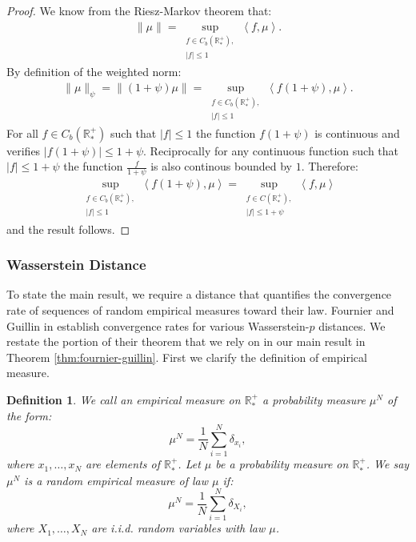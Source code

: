 \documentclass[11pt,a4paper]{article}
\newcommand{\RRP}{\mathbb{R}^+_*}
\newcommand{\brac}[1]{\left\langle#1\right\rangle}
\newtheorem{definition}[theorem]{Definition}
\begin{document}
\begin{proof}
    We know from the Riesz-Markov theorem that:
    \begin{align*}
        \|\mu\| = \sup\limits_{\substack{f \in C_b(\RRP), \\|f| \leq 1}}\brac{f,\mu}.
    \end{align*}
    By definition of the weighted norm:
    \begin{align*}
        \|\mu\|_{\psi} = \|(1 + \psi)\mu\| = \sup\limits_{\substack{f \in C_b(\RRP), \\ |f| \leq 1}}\brac{f(1 + \psi),\mu}.
    \end{align*}
    For all $f \in C_b(\RRP)$ such that $|f| \leq 1$ the function $f(1 + \psi)$ is continuous and verifies $|f(1 + \psi)| \leq 1 + \psi$. Reciprocally for any continuous function such that $|f| \leq 1 + \psi$ the function $\frac{f}{1 + \psi}$ is also continous bounded by $1$. Therefore:
    \begin{align*}
        \sup\limits_{\substack{f \in C_b(\RRP), \\|f| \leq 1}}\brac{f(1 + \psi),\mu} = \sup\limits_{\substack{f \in C(\RRP), \\ |f| \leq 1 + \psi}}\brac{f,\mu}
    \end{align*}
    and the result follows.
\end{proof}


\subsubsection*{Wasserstein Distance}
To state the main result, we require a distance that quantifies the convergence rate of sequences of random empirical measures toward their law. Fournier and Guillin in \cite{fournier2015rate} establish convergence rates for various Wasserstein-$p$ distances. We restate the portion of their theorem that we rely on in our main result in Theorem \ref{thm:fournier-guillin}. First we clarify the definition of empirical measure.
\begin{definition}
We call an \emph{empirical measure} on $\RRP$ a probability measure $\mu^N$ of the form:
\[
\mu^N = \dfrac{1}{N} \sum_{i = 1}^N \delta_{x_i},
\]
where $x_1, \dots, x_N$ are elements of $\RRP$. Let $\mu$ be a probability measure on $\RRP$. We say $\mu^N$ is a random empirical measure of \emph{law $\mu$} if:
\[
\mu^N = \dfrac{1}{N} \sum_{i = 1}^N \delta_{X_i},
\]
where $X_1, \dots, X_N$ are i.i.d. random variables with law $\mu$.
\end{definition}
\end{document}
